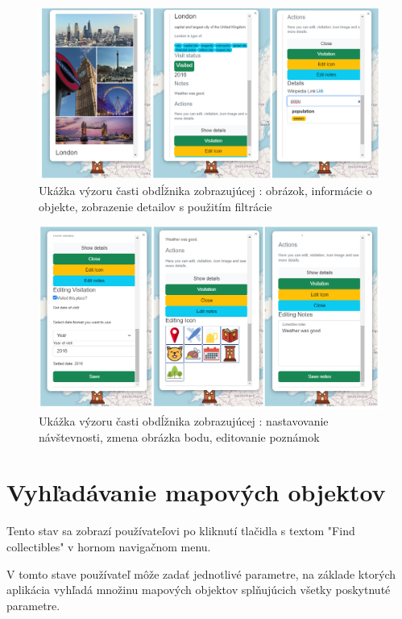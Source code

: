 \begin{figure}[h]
      \includegraphics[width=140mm]{../img/ud-obdznik-1}
      \centering
      \caption{Ukážka výzoru časti obdĺžnika zobrazujúcej : obrázok, informácie o objekte, zobrazenie detailov s použitím filtrácie}
\end{figure}

\begin{figure}[h]
      \includegraphics[width=140mm]{../img/ud-obdznik-2}
      \centering
      \caption{Ukážka výzoru časti obdĺžnika zobrazujúcej : nastavovanie návštevnosti, zmena obrázka bodu, editovanie poznámok  }
\end{figure}

\section{Vyhľadávanie mapových objektov }

Tento stav sa zobrazí používateľovi po kliknutí tlačidla s textom "Find collectibles" v hornom navigačnom menu.

V tomto stave používateľ môže zadať jednotlivé parametre, na základe ktorých aplikácia vyhľadá množinu mapových objektov splňujúcich všetky poskytnuté parametre.

